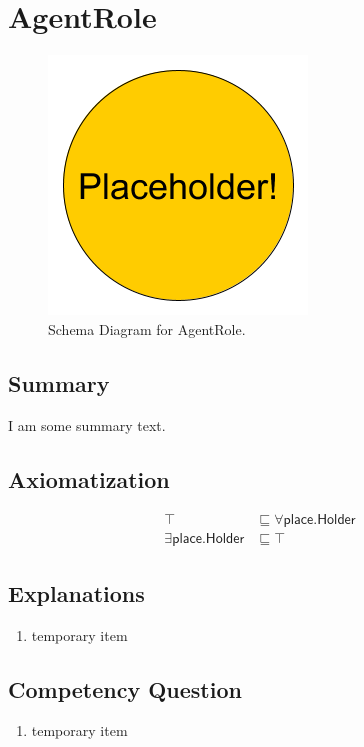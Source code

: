 \section{AgentRole}
\label{sec:AgentRole}
\begin{figure}[h!]
\begin{center}
\includegraphics[width=.4\textwidth]{figures/placeholder}
\end{center}
\caption{Schema Diagram for AgentRole.}
\label{fig:AgentRole}
\end{figure}
\subsection{Summary}
\label{sum:AgentRole}
I am some summary text.

\subsection{Axiomatization}
\label{axs:AgentRole}
\begin{align}
\top &\sqsubseteq \forall\textsf{place.Holder} \\ 
\exists\textsf{place.Holder} &\sqsubseteq \top 
\end{align}

\subsection{Explanations}
\label{exp:AgentRole}
\begin{enumerate}
\item temporary item
\end{enumerate}

\subsection{Competency Question}
\label{cqs:AgentRole}
\begin{enumerate}[CQ1.]
\item temporary item
\end{enumerate}

\newpage
